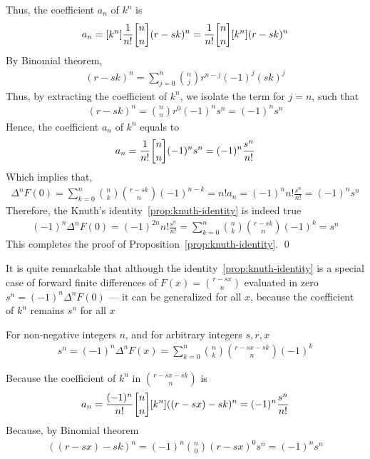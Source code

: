 Thus, the coefficient $a_n$ of $k^n$ is
\begin{align*}
  a_n
  = [k^n] \frac{1}{n!} \stirlingi{n}{n} (r-sk)^n
  = \frac{1}{n!} \stirlingi{n}{n} [k^n] (r-sk)^n
\end{align*}
By Binomial theorem,
\begin{align*}
  (r-sk)^n = \sum_{j=0}^{n} \binom{n}{j} r^{n-j} (-1)^j (sk)^j
\end{align*}
Thus, by extracting the coefficient of $k^n$, we isolate the term for $j=n$,
such that
\begin{align*}
  [k^n] (r-sk)^n
  = \binom{n}{n} r^{0} (-1)^n s^{n}
  = (-1)^{n} s^{n}
\end{align*}
Hence, the coefficient $a_n$ of $k^n$ equals to
\begin{align*}
  a_n = \frac{1}{n!} \stirlingi{n}{n} (-1)^{n} s^{n}
  = (-1)^{n} \frac{s^{n}}{n!}
\end{align*}
Which implies that,
\begin{align*}
  \Delta^{n} F(0)
  = \sum_{k=0}^{n} \binom{n}{k} \binom{r-sk}{n} (-1)^{n-k}
  = n! a_n
  = (-1)^n n! \frac{s^{n}}{n!}
  = (-1)^n s^n
\end{align*}
Therefore, the Knuth's identity~\eqref{prop:knuth-identity} is indeed true
\begin{align*}
  (-1)^n \Delta^{n} F(0)
  = (-1)^{2n} n! \frac{s^{n}}{n!}
  = \sum_{k=0}^{n} \binom{n}{k} \binom{r-sk}{n} (-1)^{k}
  = s^n
\end{align*}
This completes the proof of Proposition~\eqref{prop:knuth-identity}. \qed

It is quite remarkable that
although
the identity~\eqref{prop:knuth-identity} is a special case of
forward finite differences of $F(x) = \binom{r-sx}{n}$ evaluated
in zero $s^n = (-1)^n \Delta^{n} F(0)$ --- it can be generalized for all $x$, because
the coefficient of $k^n$ remains $s^n$ for all $x$
\begin{proposition} 
  \label{prop:generalized-knuths-identity}
  For non-negative integers $n$, and for arbitrary integers $s, r, x$
  \begin{align*}
    s^n = (-1)^n \Delta^{n} F(x)
    = \sum_{k=0}^{n} \binom{n}{k} \binom{r-sx-sk}{n} (-1)^{k}
  \end{align*}
\end{proposition}
Because the coefficient of $k^n$ in $\binom{r-sx-sk}{n}$ is
\begin{align*}
  a_n
  = \frac{(-1)^{n}}{n!} \stirlingi{n}{n} [k^n] ((r-sx)-sk)^n
  = (-1)^n \frac{s^{n}}{n!}
\end{align*}
Because, by Binomial theorem
\begin{align*}
  [k^n] ((r-sx)-sk)^n = (-1)^{n} \binom{n}{0} (r-sx)^{0} s^{n}
  = (-1)^n s^n
\end{align*}
